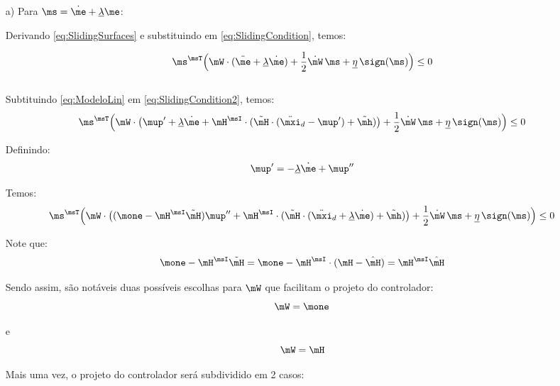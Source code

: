 \documentclass[]{politex}
\begin{document}
\begin{itemize}
\item[a)] Para $\ms = \dot{\me} + \underline{\lambda}\me$:

Derivando \eqref{eq:SlidingSurfaces} e substituindo em \eqref{eq:SlidingCondition}, temos:

\begin{equation} \label{eq:SlidingCondition2}
\ms^\msT \Big(\mW \cdot (\ddot{\me} + \underline{\lambda} \dot{\me} ) + \frac{1}{2}\dot{\mW} \, \ms + \underline{\eta} \, \sign(\ms) \Big) \leq 0
\end{equation} \\



Subtituindo \eqref{eq:ModeloLin} em \eqref{eq:SlidingCondition2}, temos:
\begin{equation} \label{eq:SlidingCondition3}
\ms^\msT \Big(\mW \cdot \big(\mup' + \underline{\lambda} \dot{\me} + \mH^\msI \cdot ( \tilde{\mH} \cdot (\ddot{\mxi}_d - \mup') + \tilde{\mh} ) \big) + \frac{1}{2}\dot{\mW} \, \ms + \underline{\eta} \, \sign(\ms) \Big) \leq 0
\end{equation}

Definindo:
\begin{equation}
\mup' = - \underline{\lambda} \dot{\me} + \mup''
\end{equation}

Temos:
\begin{equation} \label{eq:SlidingCondition3_}
\ms^\msT \Big(\mW \cdot \big( (\mone - \mH^\msI \tilde{\mH} )\mup'' + \mH^\msI \cdot ( \tilde{\mH}\cdot (\ddot{\mxi}_d + \underline{\lambda} \dot{\me}) + \tilde{\mh} ) \big) + \frac{1}{2}\dot{\mW} \, \ms + \underline{\eta} \, \sign(\ms) \Big) \leq 0
\end{equation}

Note que:
\begin{equation}
\mone - \mH^\msI \tilde{\mH} = \mone - \mH^\msI \cdot ( \mH - \hat{\mH}) = \mH^\msI \hat{\mH}
\end{equation}

Sendo assim, são notáveis duas possíveis escolhas para $\mW$ que facilitam o projeto do controlador:
\begin{equation} \label{eq:W1}
\mW = \mone
\end{equation}

e
\begin{equation} \label{eq:W2}
\mW = \mH
\end{equation}

Mais uma vez, o projeto do controlador será subdividido em 2 casos:


\end{itemize}
\end{document}

